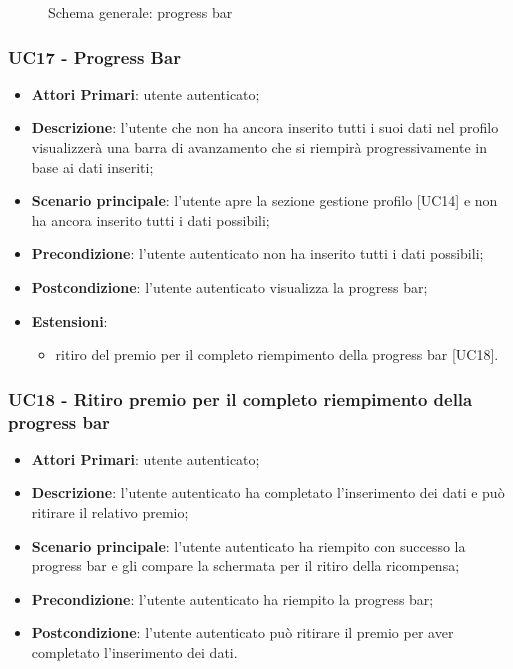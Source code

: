 \begin{figure}[h]
	\centering
	\caption{Schema generale: progress bar}
\end{figure}
\subsubsection{UC17 - Progress Bar}
\begin{itemize}
	\item \textbf{Attori Primari}: utente autenticato;
	\item \textbf{Descrizione}: l'utente che non ha ancora inserito tutti i suoi dati nel profilo visualizzerà una barra di avanzamento che si riempirà progressivamente in base ai dati inseriti;
	\item \textbf{Scenario principale}: l'utente apre la sezione gestione profilo [UC14] e non ha ancora inserito tutti i dati possibili;
	\item \textbf{Precondizione}: l'utente autenticato non ha inserito tutti i dati possibili;
	\item \textbf{Postcondizione}: l'utente autenticato visualizza la progress bar;
	\item \textbf{Estensioni}:
		\begin{itemize}
			\item ritiro del premio per il completo riempimento della progress bar [UC18].
		\end{itemize}	
\end{itemize}

\subsubsection{UC18 - Ritiro premio per il completo riempimento della progress bar}
\begin{itemize}
	\item \textbf{Attori Primari}: utente autenticato;
	\item \textbf{Descrizione}: l'utente autenticato ha completato l'inserimento dei dati e può ritirare il relativo premio;	
	\item \textbf{Scenario principale}: l'utente autenticato ha riempito con successo la progress bar e gli compare la schermata per il ritiro della ricompensa;
	\item \textbf{Precondizione}: l'utente autenticato ha riempito la progress bar;
	\item \textbf{Postcondizione}: l'utente autenticato può ritirare il premio per aver completato l'inserimento dei dati.
\end{itemize}
